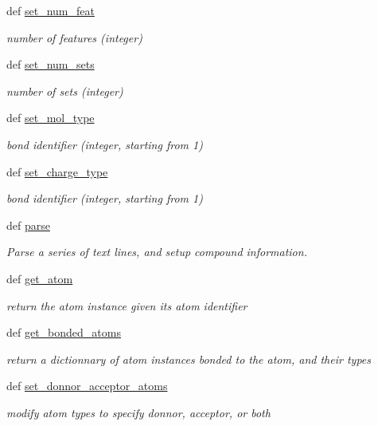 \begin{DoxyCompactItemize}
def \hyperlink{classforcebalance_1_1Mol2_1_1mol2_ab5de4b8eef6e851d9be12ecb92cf8f86}{set\-\_\-num\-\_\-feat}
\begin{DoxyCompactList}\small\item\em number of features (integer) \end{DoxyCompactList}\item 
def \hyperlink{classforcebalance_1_1Mol2_1_1mol2_a981c9a485d4db6abbcb61b8188090078}{set\-\_\-num\-\_\-sets}
\begin{DoxyCompactList}\small\item\em number of sets (integer) \end{DoxyCompactList}\item 
def \hyperlink{classforcebalance_1_1Mol2_1_1mol2_a6ee55f5fae46cee9c0e7d6683c9b5c50}{set\-\_\-mol\-\_\-type}
\begin{DoxyCompactList}\small\item\em bond identifier (integer, starting from 1) \end{DoxyCompactList}\item 
def \hyperlink{classforcebalance_1_1Mol2_1_1mol2_aaab9bc1afebb05a355c53db2a35740be}{set\-\_\-charge\-\_\-type}
\begin{DoxyCompactList}\small\item\em bond identifier (integer, starting from 1) \end{DoxyCompactList}\item 
def \hyperlink{classforcebalance_1_1Mol2_1_1mol2_a8d49f0024dfe625e1b43a244ec76f3b3}{parse}
\begin{DoxyCompactList}\small\item\em Parse a series of text lines, and setup compound information. \end{DoxyCompactList}\item 
def \hyperlink{classforcebalance_1_1Mol2_1_1mol2_af5a261aefed1c65fd5f56b5b30e69995}{get\-\_\-atom}
\begin{DoxyCompactList}\small\item\em return the atom instance given its atom identifier \end{DoxyCompactList}\item 
def \hyperlink{classforcebalance_1_1Mol2_1_1mol2_a2d2b34613f2b72ad3a7fcdc94a3de994}{get\-\_\-bonded\-\_\-atoms}
\begin{DoxyCompactList}\small\item\em return a dictionnary of atom instances bonded to the atom, and their types \end{DoxyCompactList}\item 
def \hyperlink{classforcebalance_1_1Mol2_1_1mol2_aa5a8b41dee69923e1854b0385ba588a4}{set\-\_\-donnor\-\_\-acceptor\-\_\-atoms}
\begin{DoxyCompactList}\small\item\em modify atom types to specify donnor, acceptor, or both \end{DoxyCompactList}\end{DoxyCompactItemize}
